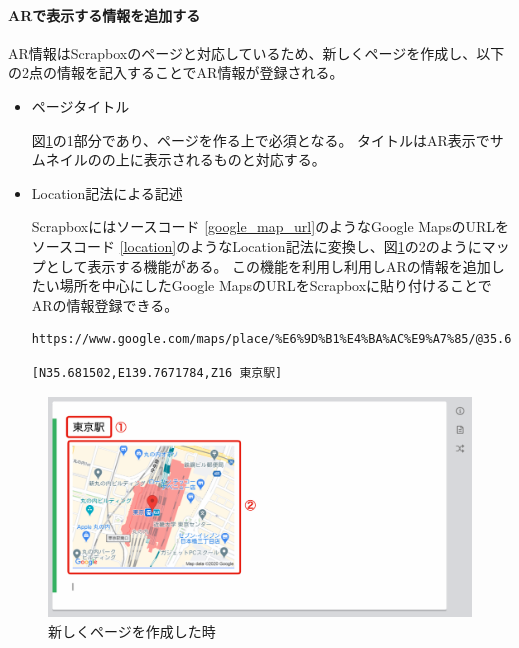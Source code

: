 \paragraph*{ARで表示する情報を追加する}
AR情報はScrapboxのページと対応しているため、新しくページを作成し、以下の2点の情報を記入することでAR情報が登録される。
\begin{itemize}
  \item ページタイトル
  
  図\ref{fig:scrapbox_ar_new}の\textcircled{\scriptsize{1}}部分であり、ページを作る上で必須となる。
  タイトルはAR表示でサムネイルのの上に表示されるものと対応する。

  \item Location記法による記述
  
  Scrapboxにはソースコード \ref{google_map_url}のようなGoogle MapsのURLをソースコード \ref{location}のようなLocation記法に変換し、図\ref{fig:scrapbox_ar_new}の\textcircled{\scriptsize{2}}のようにマップとして表示する機能がある。
  この機能を利用し利用しARの情報を追加したい場所を中心にしたGoogle MapsのURLをScrapboxに貼り付けることでARの情報登録できる。

  \begin{lstlisting}[caption=googleMapのURL, label=google_map_url]
    https://www.google.com/maps/place/%E6%9D%B1%E4%BA%AC%E9%A7%85/@35.681502,139.7671784,17z/data=!4m5!3m4!1s0x60188bfbd89f700b:0x277c49ba34ed38!8m2!3d35.6812362!4d139.7671248
  \end{lstlisting}

  \begin{lstlisting}[caption=Location記法, label=location]
    [N35.681502,E139.7671784,Z16 東京駅]
  \end{lstlisting}
\end{itemize}

\begin{figure}[h]
  \centering
  \includegraphics[width=120mm]{images/scrapbox_ar_new.png}
  \caption{新しくページを作成した時} \label{fig:scrapbox_ar_new}
\end{figure}

